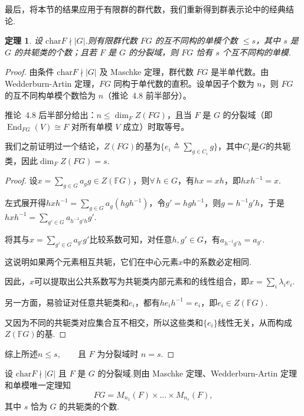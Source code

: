 \documentclass[11pt,a4paper]{article}
\theoremstyle{plain}
\newtheorem{thm}{定理}
\theoremstyle{definition}
\begin{document}
最后，将本节的结果应用于有限群的群代数，我们重新得到群表示论中的经典结论.

\begin{thm}
设 $\mathrm{char}F \nmid |G|$.则有限群代数 $FG$ 的互不同构的单模个数 $\leq s$，其中 $s$ 是 $G$ 的共轭类的个数；且若 $F$ 是 $G$ 的分裂域，则 $FG$ 恰有 $s$ 个互不同构的单模.
\end{thm}

\begin{proof}
由条件 $\mathrm{char}F \nmid |G|$ 及 Maschke 定理，群代数 $FG$ 是半单代数。由 Wedderburn-Artin 定理，$FG$ 同构于单代数的直积。设单因子个数为 $n$，则 $FG$ 的互不同构单模个数恰为 $n$（推论~4.8 前半部分）。

推论~4.8 后半部分给出：$n \leq \dim_F Z(FG)$，且当 $F$ 是 $G$ 的分裂域（即 $\operatorname{End}_{FG}(V) \cong F$ 对所有单模 $V$ 成立）时取等号。

\noindent{} 我们之前证明过一个结论，$Z(FG)$的基为$\{e_i\triangleq \sum_{g\in C_i}g\}$，其中$C_i$是$G$的共轭类，因此$\dim_F Z(FG)=s$.\par
    \begin{proof}
        设$x = \sum_{g \in G} a_g g \in Z(\mathbb{F}G)$，则$\forall\,h \in G$，有$hx = xh$，即$hxh^{-1} = x$.\par
    左式展开得$hxh^{-1} = \sum_{g \in G} a_g (hgh^{-1})$，令$g' = hgh^{-1}$，则$g = h^{-1}g'h$，于是$hxh^{-1} = \sum_{g' \in G} a_{h^{-1}g'h} g'$.\par
    将其与$x = \sum_{g' \in G} a_{g'} g'$比较系数可知，对任意$h, g' \in G$，有$a_{h^{-1}g'h} = a_{g'}$.\par
    这说明如果两个元素相互共轭，它们在中心元素$x$中的系数必定相同.\par
    因此，$x$可以提取出公共系数写为共轭类内部元素和的线性组合，即$x = \sum_i \lambda_i e_i$.\par
    另一方面，易验证对任意共轭类和$e_i$，都有$he_i h^{-1} = e_i$，即$e_i \in Z(\mathbb{F}G)$.\par
    又因为不同的共轭类对应集合互不相交，所以这些类和$\{e_i\}$线性无关，从而构成$Z(\mathbb{F}G)$的基.
    \end{proof}
综上所述$n \leq s, \qquad \text{且 } F \text{ 为分裂域时 } n = s$.
\end{proof}


\noindent 设 $\mathrm{char}F \nmid |G|$ 且 $F$ 是 $G$ 的分裂域.则由 Maschke 定理、Wedderburn-Artin 定理和单模唯一定理知
$$
FG = M_{n_1}(F) \times \dots \times M_{n_s}(F),
$$
其中 $s$ 恰为 $G$ 的共轭类的个数.
\end{document}
